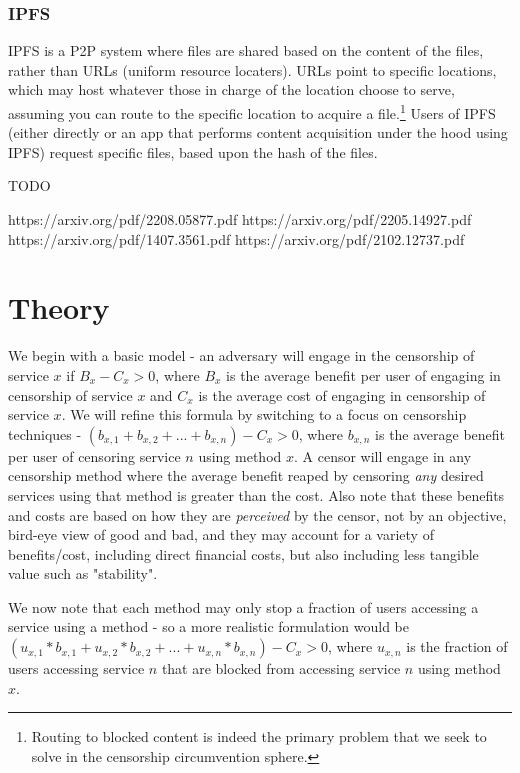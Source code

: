 \documentclass[12pt]{report}
\begin{document}
\subsection{IPFS}

IPFS is a P2P system where files are shared based on the content of the files, rather than URLs (uniform resource locaters). URLs point to specific locations, which may host whatever those in charge of the location choose to serve, assuming you can route to the specific location to acquire a file.\footnote{Routing to blocked content is indeed the primary problem that we seek to solve in the censorship circumvention sphere.} Users of IPFS (either directly or an app that performs content acquisition under the hood using IPFS) request specific files, based upon the hash of the files.

TODO

https://arxiv.org/pdf/2208.05877.pdf
https://arxiv.org/pdf/2205.14927.pdf
https://arxiv.org/pdf/1407.3561.pdf
https://arxiv.org/pdf/2102.12737.pdf

\chapter{Theory}
\label{theory}

We begin with a basic model - an adversary will engage in the censorship of service $x$ if $B_x - C_x > 0$, where $B_x$ is the average benefit per user of engaging in censorship of service $x$ and $C_x$ is the average cost of engaging in censorship of service $x$. We will refine this formula by switching to a focus on censorship techniques - $(b_{x,1} + b_{x,2} + ... + b_{x,n}) - C_x > 0$, where $b_{x,n}$ is the average benefit per user of censoring service $n$ using method $x$. A censor will engage in any censorship method where the average benefit reaped by censoring \emph{any} desired services using that method is greater than the cost. Also note that these benefits and costs are based on how they are \emph{perceived} by the censor, not by an objective, bird-eye view of good and bad, and they may account for a variety of benefits/cost, including direct financial costs, but also including less tangible value such as "stability".

We now note that each method may only stop a fraction of users accessing a service using a method - so a more realistic formulation would be $(u_{x,1}*b_{x,1} + u_{x,2}*b_{x,2} + ... + u_{x,n}*b_{x,n}) - C_x > 0$, where $u_{x,n}$ is the fraction of users accessing service $n$ that are blocked from accessing service $n$ using method $x$.
\end{document}
